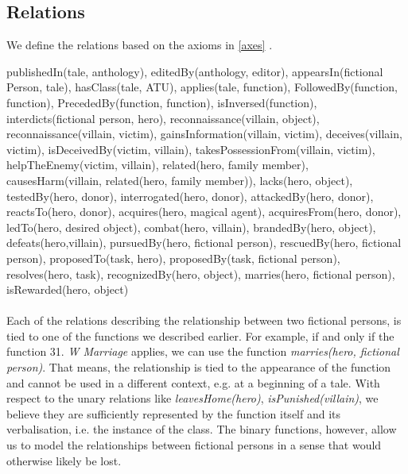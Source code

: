 \documentclass[10pt,a4paper]{article}
\begin{document}
\subsection{Relations}
We define the relations based on the axioms in \ref{axes} . 

publishedIn(tale, anthology), editedBy(anthology, editor), appearsIn(fictional Person, tale), hasClass(tale, ATU), applies(tale, function), FollowedBy(function, function), PrecededBy(function, function), isInversed(function), interdicts(fictional person, hero), reconnaissance(villain, object), reconnaissance(villain, victim), gainsInformation(villain, victim), deceives(villain, victim), isDeceivedBy(victim, villain), takesPossessionFrom(villain, victim), helpTheEnemy(victim, villain), related(hero, family member), causesHarm(villain, related(hero, family member)), lacks(hero, object), testedBy(hero, donor), interrogated(hero, donor), attackedBy(hero, donor), reactsTo(hero, donor), acquires(hero, magical agent), acquiresFrom(hero, donor), ledTo(hero, desired object), combat(hero, villain), brandedBy(hero, object), defeats(hero,villain), pursuedBy(hero, fictional person), rescuedBy(hero, fictional person), proposedTo(task, hero), proposedBy(task, fictional person), resolves(hero, task), recognizedBy(hero, object), marries(hero, fictional person), isRewarded(hero, object)
\\ \\
Each of the relations describing the relationship between two fictional persons, is tied to one of the functions we described earlier. For example, if and only if the function 31. \textit{W Marriage} applies, we can use the function \textit{marries(hero, fictional person)}. That means, the relationship is tied to the appearance of the function and cannot be used in a different context, e.g. at a beginning of a tale. 
With respect to the unary relations like \textit{leavesHome(hero)}, \textit{isPunished(villain)}, we believe they are sufficiently represented by the function itself and its verbalisation, i.e. the instance of the class. The binary functions, however, allow us to model the relationships between fictional persons in a sense that would otherwise likely be lost.  



\normalsize
\newpage
\end{document}
